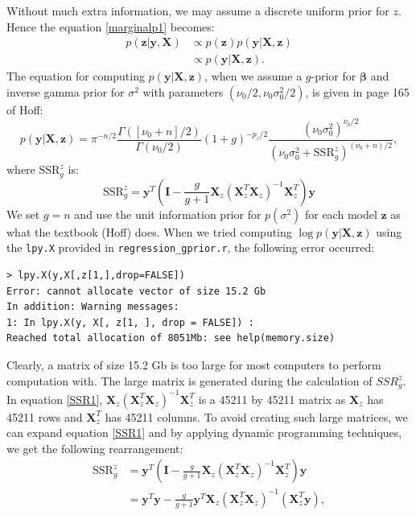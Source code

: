 \documentclass[a4page]{article}
\begin{document}
	Without much extra information, we may assume a discrete uniform prior for $z$. Hence the equation \ref{marginalp1} becomes:
	\begin{equation}
	\begin{split}
	p(\bm{z}|\bm{y},\bm{X})&\propto p(\bm{z})p(\bm{y}|\bm{X},\bm{z})\\
	&\propto p(\bm{y}|\bm{X},\bm{z}).\label{marginalp2}
	\end{split}
	\end{equation}
	The equation for computing $p(\bm{y}|\bm{X},\bm{z})$, when we assume a $g$-prior for $\bm{\beta}$ and inverse gamma prior for $\sigma^2$ with parameters $(\nu_0/2,\nu_0\sigma_0^2/2)$, is given in page 165 of Hoff:
	\begin{equation}
	p(\bm{y}|\bm{X},\bm{z})=\pi^{-n/2}\frac{\mathit{\Gamma}([\nu_0+n]/2)}
		{\mathit{\Gamma}(\nu_0/2)}(1+g)^{-p_z/2}
		\frac{(\nu_0\sigma_0^2)^{\nu_0/2}}
		{(\nu_0\sigma_0^2+\text{SSR}_g^z)^{(\nu_0+n)/2}},\label{marginalp3}
	\end{equation}
	where $\text{SSR}_g^z$ is:
	\begin{equation}
	\text{SSR}_g^z=\bm{y}^T(\textbf{I}-\frac{g}{g+1}\textbf{X}_z(\textbf{X}_z^T\textbf{X}_z)^{-1}\textbf{X}_z^T)\bm{y}
	\label{SSR1}
	\end{equation}
	We set $g=n$ and use the unit information prior for $p(\sigma^2)$ for each model $\bm{z}$ as what the textbook (Hoff) does.
	When we tried computing $\log p(\bm{y}|\bm{X},\bm{z})$ using the \verb|lpy.X| provided in \verb|regression_gprior.r|, the following error occurred:
	\begin{singlespace}
		\begin{verbatim}
> lpy.X(y,X[,z[1,],drop=FALSE])
Error: cannot allocate vector of size 15.2 Gb
In addition: Warning messages:
1: In lpy.X(y, X[, z[1, ], drop = FALSE]) :
Reached total allocation of 8051Mb: see help(memory.size)
		\end{verbatim}
	\end{singlespace}
	Clearly, a matrix of size 15.2 Gb is too large for most computers to perform computation with. The large matrix is generated during the calculation of $SSR_g^z$. In equation \ref{SSR1},  $\textbf{X}_z(\textbf{X}_z^T\textbf{X}_z)^{-1}\textbf{X}_z^T$ is a 45211 by 45211 matrix as $\textbf{X}_z$ has 45211 rows and 
	$\textbf{X}_z^T$ has 45211 columns. To avoid creating such large matrices, we can expand equation \ref{SSR1} and by applying dynamic programming techniques, we get the following rearrangement:
	\begin{equation}
	\begin{split}	
	\text{SSR}_g^z
	&=\bm{y}^T(\textbf{I}-\frac{g}{g+1}\textbf{X}_z(\textbf{X}_z^T\textbf{X}_z)^{-1}\textbf{X}_z^T)\bm{y}\\
	&=\bm{y}^T\bm{y}-\frac{g}{g+1}\bm{y}^T\textbf{X}_z(\textbf{X}_z^T\textbf{X}_z)^{-1}(\textbf{X}_z^T\bm{y}),
	\label{SSR2}
	\end{split}
	\end{equation}
\end{document}
